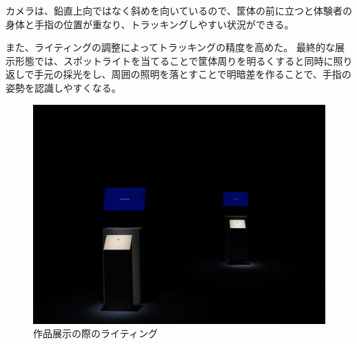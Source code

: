 カメラは、鉛直上向ではなく斜めを向いているので、筐体の前に立つと体験者の身体と手指の位置が重なり、トラッキングしやすい状況ができる。

また、ライティングの調整によってトラッキングの精度を高めた。
最終的な展示形態では、スポットライトを当てることで筐体周りを明るくすると同時に照り返しで手元の採光をし、周囲の照明を落とすことで明暗差を作ることで、手指の姿勢を認識しやすくなる。

\begin{figure}[H]
  \centering
  \includegraphics[width=12cm]{img/lighting.jpg}
  \caption{作品展示の際のライティング}
  \label{fig:lighting}
\end{figure}
